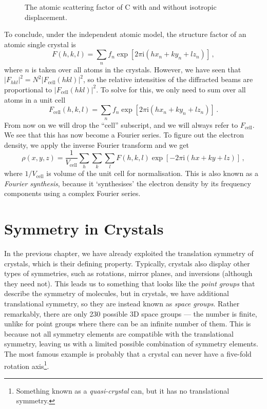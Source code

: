 \documentclass{article}
\theoremstyle{plain}\theoremheaderfont{\normalfont\itshape}\theorembodyfont{\rmfamily}\theoremseparator{.}\newtheorem*{rem}{Remark}\newtheorem*{ex}{Example}\newtheorem*{proof}{Proof}\newtheorem*{altp}{Alternative proof}
\theoremstyle{plain}\theoremheaderfont{\normalfont\bfseries}\theorembodyfont{\rmfamily}\theoremseparator{.}\newtheorem{thm}{Theorem}[section]\newtheorem{lem}[thm]{Lemma}\newtheorem{prop}[thm]{Proposition}\newtheorem*{cor}{Corollary}\newtheorem{defn}[thm]{Definition}\newtheorem{clm}[thm]{Claim}\newtheorem{clminproof}{Claim}\newtheorem*{law}{Law}\newtheorem{pos}[thm]{Postulate}
\theoremstyle{break}\theoremheaderfont{\normalfont\itshape}\theorembodyfont{\rmfamily}\theoremseparator{.\medskip}\newtheorem*{proofskip}{Proof}\newtheorem*{exs}{Examples}\newtheorem*{rems}{Remarks}
\theoremstyle{break}\theoremheaderfont{\normalfont\bfseries}\theorembodyfont{\rmfamily}\theoremseparator{.\medskip}\newtheorem{lemskip}[thm]{Lemma}\newtheorem{defnskip}[thm]{Definition}\newtheorem{propskip}[thm]{Proposition}\newtheorem{thmskip}[thm]{Theorem}
\numberwithin{equation}{section}
\newcommand{\ii}{\mathrm{i}}
\newcommand{\abs}[1]{\left| #1 \right|}
\begin{document}
    \begin{figure}
        \centering
        
        \caption{The atomic scattering factor of \(\mathrm{C}\) with and without isotropic displacement.}
    \end{figure}

    To conclude, under the independent atomic model, the structure factor of an atomic single crystal is
    \begin{equation}
        F(h,k,l)=\sum_n f_n\exp[2\pi \ii(hx_n+ky_n+lz_n)]\,,
    \end{equation}
    where \(n\) is taken over all atoms in the crystals. However, we have seen that \(\abs{F_{hkl}}^2=N^2\abs{F_{\text{cell}}(hkl)}^2\), so the relative intensities of the diffracted beams are proportional to \(\abs{F_{\text{cell}}(hkl)}^2\). To solve for this, we only need to sum over all atoms in a unit cell
    \begin{equation}
        F_{\text{cell}}(h,k,l)=\sum_n f_n\exp[2\pi \ii(hx_n+ky_n+lz_n)]\,.
    \end{equation}
    From now on we will drop the ``cell'' subscript, and we will always refer to \(F_{\text{cell}}\). We see that this has now become a Fourier series. To figure out the electron density, we apply the inverse Fourier transform and we get
    \begin{equation}\label{Fourier_synthesis}
        \rho(x,y,z)=\frac{1}{V_{\text{cell}}}\sum_{h}\sum_{k}\sum_{l}F(h,k,l)\exp[-2\pi \ii(hx+ky+lz)]\,,
    \end{equation}
    where \(1/V_{\text{cell}}\) is volume of the unit cell for normalisation. This is also known as a \textit{Fourier synthesis}, because it `synthesises' the electron density by its frequency components using a complex Fourier series.

    \newpage

    \section{Symmetry in Crystals}
    In the previous chapter, we have already exploited the translation symmetry of crystals, which is their defining property. Typically, crystals also display other types of symmetries, such as rotations, mirror planes, and inversions (although they need not). This leads us to something that looks like the \textit{point groups} that describe the symmetry of molecules, but in crystals, we have additional translational symmetry, so they are instead known as \textit{space groups}. Rather remarkably, there are only 230 possible 3D space groups --- the number is finite, unlike for point groups where there can be an infinite number of them. This is because not all symmetry elements are compatible with the translational symmetry, leaving us with a limited possible combination of symmetry elements. The most famous example is probably that a crystal can never have a five-fold rotation axis\footnote{Something known as a \textit{quasi-crystal} can, but it has no translational symmetry.}.
\end{document}
